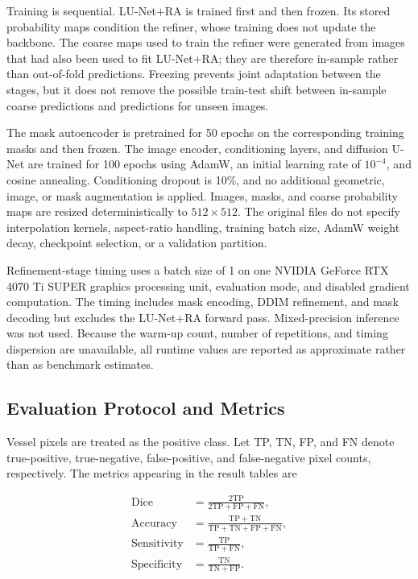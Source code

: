 \documentclass[jimaging,article,submit,pdftex,moreauthors]{Definitions/mdpi}%
\begin{document}
Training is sequential. LU-Net+RA is trained first and then frozen. Its stored probability maps condition the refiner, whose training does not update the backbone. The coarse maps used to train the refiner were generated from images that had also been used to fit LU-Net+RA; they are therefore in-sample rather than out-of-fold predictions. Freezing prevents joint adaptation between the stages, but it does not remove the possible train-test shift between in-sample coarse predictions and predictions for unseen images.



The mask autoencoder is pretrained for 50 epochs on the corresponding training masks and then frozen. The image encoder, conditioning layers, and diffusion U-Net are trained for 100 epochs using AdamW, an initial learning rate of $10^{-4}$, and cosine annealing. Conditioning dropout is 10\%, and no additional geometric, image, or mask augmentation is applied. Images, masks, and coarse probability maps are resized deterministically to $512\times512$. The original files do not specify interpolation kernels, aspect-ratio handling, training batch size, AdamW weight decay, checkpoint selection, or a validation partition.



Refinement-stage timing uses a batch size of 1 on one NVIDIA GeForce RTX 4070 Ti SUPER graphics processing unit, evaluation mode, and disabled gradient computation. The timing includes mask encoding, DDIM refinement, and mask decoding but excludes the LU-Net+RA forward pass. Mixed-precision inference was not used. Because the warm-up count, number of repetitions, and timing dispersion are unavailable, all runtime values are reported as approximate rather than as benchmark estimates.



\subsection{Evaluation Protocol and Metrics}

\label{sec:metrics}



Vessel pixels are treated as the positive class. Let TP, TN, FP, and FN denote true-positive, true-negative, false-positive, and false-negative pixel counts, respectively. The metrics appearing in the result tables are

\begin{align}
\mathrm{Dice} &= \frac{2\mathrm{TP}}{2\mathrm{TP}+\mathrm{FP}+\mathrm{FN}}, \\
\mathrm{Accuracy} &= \frac{\mathrm{TP}+\mathrm{TN}}
{\mathrm{TP}+\mathrm{TN}+\mathrm{FP}+\mathrm{FN}}, \\
\mathrm{Sensitivity} &= \frac{\mathrm{TP}}{\mathrm{TP}+\mathrm{FN}}, \\
\mathrm{Specificity} &= \frac{\mathrm{TN}}{\mathrm{TN}+\mathrm{FP}}.
\end{align}
\end{document}
